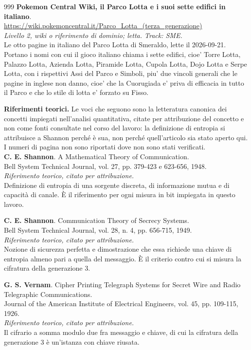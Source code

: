 \begin{thebibliography}{999}
  \textbf{Pokemon Central Wiki, il Parco Lotta e i suoi sette edifici in italiano}.
  \\ \url{https://wiki.pokemoncentral.it/Parco_Lotta_(terza_generazione)}
  \\ \emph{Livello 2, wiki o riferimento di dominio; letta. Track: SME.}
  \\ Le otto pagine in italiano del Parco Lotta di Smeraldo, lette il 2026-09-21. Portano i nomi con cui il gioco italiano chiama i sette edifici, cioe' Torre Lotta, Palazzo Lotta, Azienda Lotta, Piramide Lotta, Cupola Lotta, Dojo Lotta e Serpe Lotta, con i rispettivi Assi del Parco e Simboli, piu' due vincoli generali che le pagine in inglese non danno, cioe' che la Cuorugiada e' priva di efficacia in tutto il Parco e che lo stile di lotta e' forzato su Fisso.

\medskip
\noindent \textbf{Riferimenti teorici.} Le voci che seguono sono la letteratura canonica dei concetti impiegati nell'analisi quantitativa, citate per attribuzione del concetto e non come fonti consultate nel corso del lavoro: la definizione di entropia si attribuisce a Shannon perché è sua, non perché quell'articolo sia stato aperto qui. I numeri di pagina non sono riportati dove non sono stati verificati.\\[0.8ex]

  \textbf{C. E. Shannon}. A Mathematical Theory of Communication.
  \\ Bell System Technical Journal, vol. 27, pp. 379-423 e 623-656, 1948.
  \\ \emph{Riferimento teorico, citato per attribuzione.}
  \\ Definizione di entropia di una sorgente discreta, di informazione mutua e di capacità di canale. È il riferimento per ogni misura in bit impiegata in questo lavoro.

  \textbf{C. E. Shannon}. Communication Theory of Secrecy Systems.
  \\ Bell System Technical Journal, vol. 28, n. 4, pp. 656-715, 1949.
  \\ \emph{Riferimento teorico, citato per attribuzione.}
  \\ Nozione di sicurezza perfetta e dimostrazione che essa richiede una chiave di entropia almeno pari a quella del messaggio. È il criterio contro cui si misura la cifratura della generazione 3.

  \textbf{G. S. Vernam}. Cipher Printing Telegraph Systems for Secret Wire and Radio Telegraphic Communications.
  \\ Journal of the American Institute of Electrical Engineers, vol. 45, pp. 109-115, 1926.
  \\ \emph{Riferimento teorico, citato per attribuzione.}
  \\ Il cifrario a somma modulo due fra messaggio e chiave, di cui la cifratura della generazione 3 è un'istanza con chiave riusata.


\end{thebibliography}
